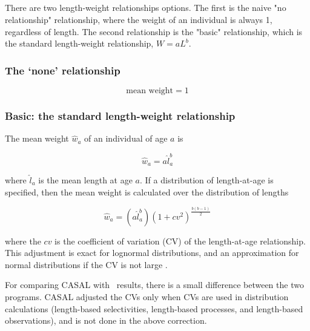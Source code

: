 \subsection{}\label{sec:MeanWeight}\label{sec:LengthWeight}

There are two length-weight relationships options. The first is the naive "no relationship" relationship, where the weight of an individual is always 1, regardless of length. The second relationship is the "basic" relationship, which is the standard length-weight relationship, $W = aL^b$.

\subsubsection{The `none' relationship}\label{sec:LengthWeight-None}

\begin{equation}
  \text{mean weight}=1
\end{equation}

\subsubsection{Basic: the standard length-weight relationship}\label{sec:LengthWeight-Basic}

The mean weight $\hat{w}_a$ of an individual of age $a$ is

\begin{equation}
  \hat{w}_a=a \hat{l}_a^b
\end{equation}

where $\hat{l}_a$ is the mean length at age $a$. If a distribution of length-at-age is specified, then the mean weight is calculated over the distribution of lengths

\begin{equation}\label{eq:mean_weight_with_adjustment}
  \hat{w}_a=(a\hat{l}_a^b)(1+cv^2)^{\frac{b(b-1)}{2}}
\end{equation}

where the $cv$ is the coefficient of variation (CV) of the length-at-age relationship. This adjustment is exact for lognormal distributions, and an approximation for normal distributions if the CV is not large \citep{1388}. 

For comparing CASAL with \CNAME\ results, there is a small difference between the two programs. CASAL adjusted the CVs  only when CVs are used in distribution calculations (length-based selectivities, length-based processes, and length-based observations), and is not done in the above correction.

